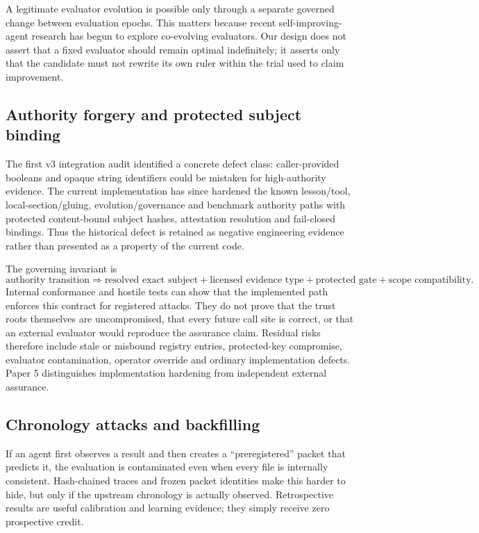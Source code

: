 A legitimate evaluator evolution is possible only through a separate governed change between evaluation epochs. This matters because recent self-improving-agent research has begun to explore co-evolving evaluators. Our design does not assert that a fixed evaluator should remain optimal indefinitely; it asserts only that the candidate must not rewrite its own ruler within the trial used to claim improvement.

\subsection{Authority forgery and protected subject binding}

The first v3 integration audit identified a concrete defect class: caller-provided booleans and opaque string identifiers could be mistaken for high-authority evidence. The current implementation has since hardened the known lesson/tool, local-section/gluing, evolution/governance and benchmark authority paths with protected content-bound subject hashes, attestation resolution and fail-closed bindings. Thus the historical defect is retained as negative engineering evidence rather than presented as a property of the current code.

The governing invariant is
\[
\text{authority transition}
\Rightarrow
\text{resolved exact subject}
+\text{licensed evidence type}
+\text{protected gate}
+\text{scope compatibility}.
\]
Internal conformance and hostile tests can show that the implemented path enforces this contract for registered attacks. They do not prove that the trust roots themselves are uncompromised, that every future call site is correct, or that an external evaluator would reproduce the assurance claim. Residual risks therefore include stale or misbound registry entries, protected-key compromise, evaluator contamination, operator override and ordinary implementation defects. Paper 5 distinguishes implementation hardening from independent external assurance.

\subsection{Chronology attacks and backfilling}

If an agent first observes a result and then creates a ``preregistered'' packet that predicts it, the evaluation is contaminated even when every file is internally consistent. Hash-chained traces and frozen packet identities make this harder to hide, but only if the upstream chronology is actually observed. Retrospective results are useful calibration and learning evidence; they simply receive zero prospective credit.

